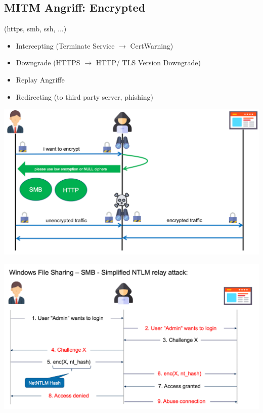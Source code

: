 \subsection{MITM Angriff: Encrypted}
(https, smb, ssh, ...)
\begin{itemize}
    \item Intercepting (Terminate Service $\rightarrow$ CertWarning)
    \item Downgrade (HTTPS $\rightarrow$ HTTP/ TLS Version Downgrade)
    \item Replay Angriffe
    \item Redirecting (to third party server, phishing)
\end{itemize}
\begin{center}
    \vspace{-8pt}
    \includegraphics[width=.8\linewidth]{./img/09-mitm/mitm_enctypt_2}
    \vspace{-8pt}
\end{center}
\begin{center}
    \vspace{-8pt}
    \includegraphics[width=.8\linewidth]{./img/09-mitm/mitm_enctypt_3}
    \vspace{-8pt}
\end{center}
